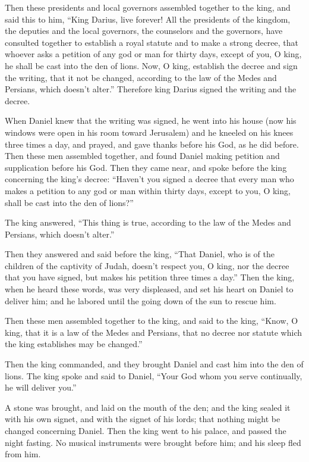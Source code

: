  Then these presidents and local governors assembled
together to the king, and said this to him, ``King Darius, live forever!
 All the presidents of the kingdom, the deputies and the
local governors, the counselors and the governors, have consulted
together to establish a royal statute and to make a strong decree, that
whoever asks a petition of any god or man for thirty days, except of
you, O king, he shall be cast into the den of lions.  Now, O
king, establish the decree and sign the writing, that it not be changed,
according to the law of the Medes and Persians, which doesn't alter.''
 Therefore king Darius signed the writing and the decree.

 When Daniel knew that the writing was signed, he went into
his house (now his windows were open in his room toward Jerusalem) and
he kneeled on his knees three times a day, and prayed, and gave thanks
before his God, as he did before.  Then these men assembled
together, and found Daniel making petition and supplication before his
God.  Then they came near, and spoke before the king
concerning the king's decree: ``Haven't you signed a decree that every
man who makes a petition to any god or man within thirty days, except to
you, O king, shall be cast into the den of lions?''

The king answered, ``This thing is true, according to the law of the
Medes and Persians, which doesn't alter.''

 Then they answered and said before the king, ``That
Daniel, who is of the children of the captivity of Judah, doesn't
respect you, O king, nor the decree that you have signed, but makes his
petition three times a day.''  Then the king, when he heard
these words, was very displeased, and set his heart on Daniel to deliver
him; and he labored until the going down of the sun to rescue him.

 Then these men assembled together to the king, and said to
the king, ``Know, O king, that it is a law of the Medes and Persians,
that no decree nor statute which the king establishes may be changed.''

 Then the king commanded, and they brought Daniel and cast
him into the den of lions. The king spoke and said to Daniel, ``Your God
whom you serve continually, he will deliver you.''

 A stone was brought, and laid on the mouth of the den; and
the king sealed it with his own signet, and with the signet of his
lords; that nothing might be changed concerning Daniel. 
Then the king went to his palace, and passed the night fasting. No
musical instruments were brought before him; and his sleep fled from
him.

